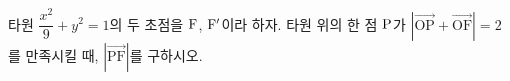 타원 $\dfrac{x^2}{9}+y^2=1$의 두 초점을 $\mathrm{F}$, $\mathrm{F'}$이라 하자. 타원 위의 한 점 $\mathrm{P}$가 $|\overrightarrow{\mathrm{OP}}+\overrightarrow{\mathrm{OF}}|=2$를 만족시킬 때, $|\overrightarrow{\mathrm{PF}}|$를 구하시오. 
